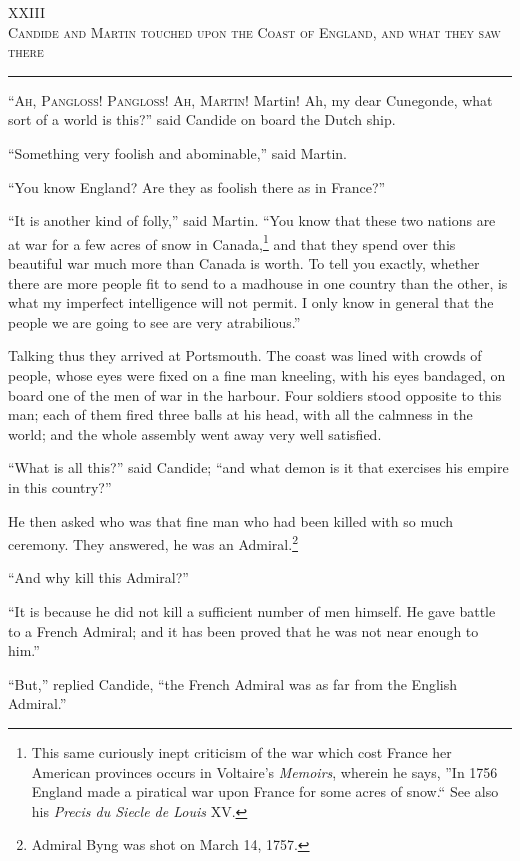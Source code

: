 \begin{center}
XXIII\\
\textsc{Candide and Martin touched upon the Coast of England, and what they saw there}
\end{center}
\vspace{-0.5cm}
\rule{\textwidth}{0.5pt}
\lettrine{``A}{h, Pangloss! Pangloss! Ah, Martin!} Martin! Ah, my dear Cunegonde, what sort of a world is this?'' said Candide on board the Dutch ship.

``Something very foolish and abominable,'' said Martin.

``You know England? Are they as foolish there as in France?''

``It is another kind of folly,'' said Martin. ``You know that these two nations are at war for a few acres of snow in Canada,\footnote{This same curiously inept criticism of the war which cost France her American provinces occurs in Voltaire's \textit{Memoirs}, wherein he says, ''In 1756 England made a piratical war upon France for some acres of snow.`` See also his \textit{Precis du Siecle de Louis} XV.} and that they spend over this beautiful war much more than Canada is worth. To tell you exactly, whether there are more people fit to send to a madhouse in one country than the other, is what my imperfect intelligence will not permit. I only know in general that the people we are going to see are very atrabilious.''

Talking thus they arrived at Portsmouth. The coast was lined with crowds of people, whose eyes were fixed on a fine man kneeling, with his eyes bandaged, on board one of the men of war in the harbour. Four soldiers stood opposite to this man; each of them fired three balls at his head, with all the calmness in the world; and the whole assembly went away very well satisfied.

``What is all this?'' said Candide; ``and what demon is it that exercises his empire in this country?''

He then asked who was that fine man who had been killed with so much ceremony. They answered, he was an Admiral.\footnote{Admiral Byng was shot on March 14, 1757.}

``And why kill this Admiral?''

``It is because he did not kill a sufficient number of men himself. He gave battle to a French Admiral; and it has been proved that he was not near enough to him.''

``But,'' replied Candide, ``the French Admiral was as far from the English Admiral.''

